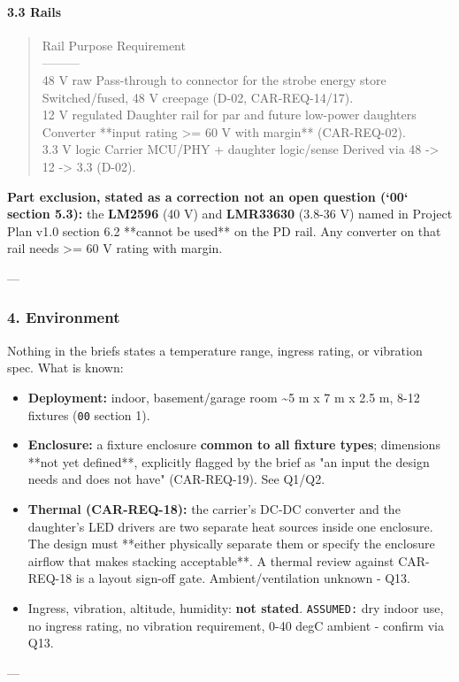 \documentclass[11pt,a4paper]{article}
\begin{document}
\paragraph*{3.3 Rails}
\begin{quote}\small\ttfamily\raggedright
\textbar{} Rail \textbar{} Purpose \textbar{} Requirement \textbar{}\\
\textbar{}---\textbar{}---\textbar{}---\textbar{}\\
\textbar{} 48 V raw \textbar{} Pass-through to connector for the strobe energy store \textbar{} Switched/fused, 48 V creepage (D-02, CAR-REQ-14/17). \textbar{}\\
\textbar{} 12 V regulated \textbar{} Daughter rail for par and future low-power daughters \textbar{} Converter {*}{*}input rating \textgreater{}= 60 V with margin{*}{*} (CAR-REQ-02). \textbar{}\\
\textbar{} 3.3 V logic \textbar{} Carrier MCU/PHY + daughter logic/sense \textbar{} Derived via 48 -\textgreater{} 12 -\textgreater{} 3.3 (D-02). \textbar{}
\end{quote}
\textbf{Part exclusion, stated as a correction not an open question (`00` section 5.3):} the \textbf{LM2596} (40 V) and \textbf{LMR33630} (3.8-36 V) named in Project Plan v1.0 section 6.2 {*}{*}cannot be used{*}{*} on the PD rail. Any converter on that rail needs \textgreater{}= 60 V rating with margin.

---

\subsubsection*{4. Environment}
Nothing in the briefs states a temperature range, ingress rating, or vibration spec. What is known:

\begin{itemize}
\item \textbf{Deployment:} indoor, basement/garage room \textasciitilde{}5 m x 7 m x 2.5 m, 8-12 fixtures (\texttt{00} section 1).
\item \textbf{Enclosure:} a fixture enclosure \textbf{common to all fixture types}; dimensions {*}{*}not yet
defined{*}{*}, explicitly flagged by the brief as "an input the design needs and does not have"
(CAR-REQ-19). See Q1/Q2.
\item \textbf{Thermal (CAR-REQ-18):} the carrier's DC-DC converter and the daughter's LED drivers are two
separate heat sources inside one enclosure. The design must {*}{*}either physically separate them
or specify the enclosure airflow that makes stacking acceptable{*}{*}. A thermal review against
CAR-REQ-18 is a layout sign-off gate. Ambient/ventilation unknown - Q13.
\item Ingress, vibration, altitude, humidity: \textbf{not stated}. \texttt{ASSUMED:} dry indoor use, no ingress
rating, no vibration requirement, 0-40 degC ambient - confirm via Q13.
\end{itemize}
---
\end{document}
